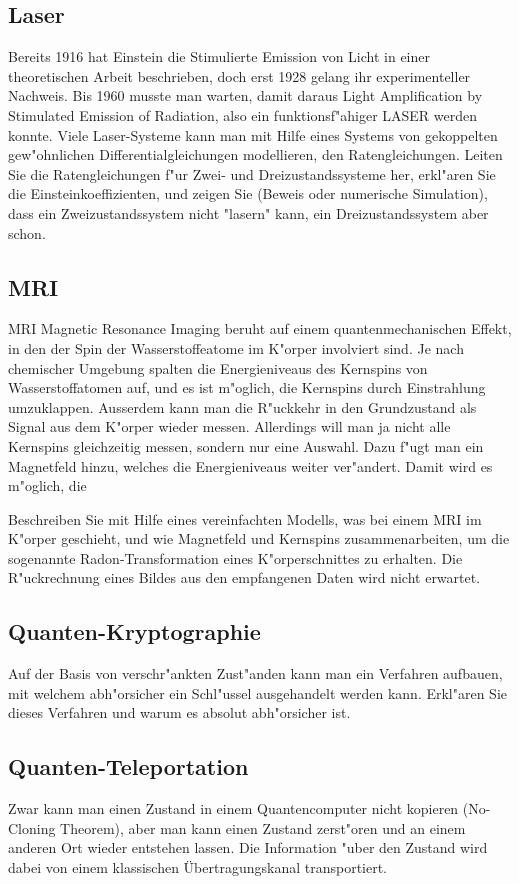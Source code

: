\subsection{Laser}
Bereits 1916 hat Einstein die Stimulierte Emission von Licht in
einer theoretischen Arbeit beschrieben, doch erst 1928 gelang ihr
experimenteller Nachweis. Bis 1960 musste man warten, damit daraus
Light Amplification by Stimulated Emission of Radiation, also ein
funktionsf"ahiger LASER werden konnte. Viele Laser-Systeme kann man
mit Hilfe eines Systems von gekoppelten gew"ohnlichen
Differentialgleichungen modellieren, den Ratengleichungen. Leiten
Sie die Ratengleichungen f"ur Zwei- und Dreizustandssysteme her,
erkl"aren Sie die Einsteinkoeffizienten, und zeigen Sie (Beweis oder
numerische Simulation), dass ein Zweizustandssystem nicht "lasern"
kann, ein Dreizustandssystem aber schon.

\subsection{MRI}
MRI Magnetic Resonance Imaging beruht auf einem quantenmechanischen
Effekt, in den der Spin der Wasserstoffeatome im K"orper involviert
sind. Je nach chemischer Umgebung spalten die Energieniveaus des
Kernspins von Wasserstoffatomen auf, und es ist m"oglich, die Kernspins
durch Einstrahlung umzuklappen. Ausserdem kann man die R"uckkehr in
den Grundzustand als Signal aus dem K"orper wieder messen. Allerdings
will man ja nicht alle Kernspins gleichzeitig messen, sondern nur
eine Auswahl. Dazu f"ugt man ein Magnetfeld hinzu, welches die
Energieniveaus weiter ver"andert. Damit wird es m"oglich, die

Beschreiben Sie mit Hilfe eines vereinfachten Modells, was bei einem
MRI im K"orper geschieht, und wie Magnetfeld und Kernspins
zusammenarbeiten, um die sogenannte Radon-Transformation eines
K"orperschnittes zu erhalten. Die R"uckrechnung eines Bildes aus den
empfangenen Daten wird nicht erwartet.

\subsection{Quanten-Kryptographie}
Auf der Basis von verschr"ankten Zust"anden kann man ein Verfahren
aufbauen, mit welchem abh"orsicher ein Schl"ussel ausgehandelt werden
kann. Erkl"aren Sie dieses Verfahren und warum es absolut abh"orsicher
ist.

\subsection{Quanten-Teleportation}
Zwar kann man einen Zustand in einem Quantencomputer nicht kopieren
(No-Cloning Theorem), aber man kann einen Zustand zerst"oren und an
einem anderen Ort wieder entstehen lassen. Die Information "uber den
Zustand wird dabei von einem klassischen Übertragungskanal
transportiert.

